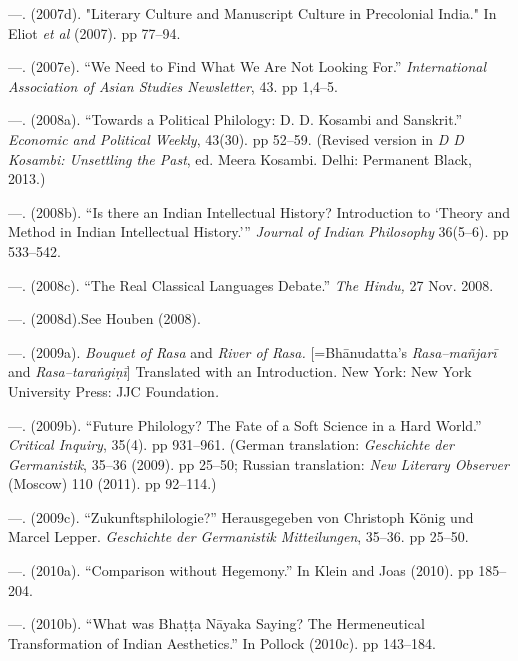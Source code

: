  \item —. (2007d). "Literary Culture and Manuscript Culture in Precolonial India." In Eliot \textit{et al} (2007). pp 77–94.

 \item —. (2007e). “We Need to Find What We Are Not Looking For.” \textit{International Association of Asian Studies Newsletter}, 43. pp 1,4–5.

 \item —. (2008a). “Towards a Political Philology: D. D. Kosambi and Sanskrit.” \textit{Economic and Political Weekly}, 43(30). pp 52–59. (Revised version in \textit{D D Kosambi: Unsettling the Past}, ed. Meera Kosambi. Delhi: Permanent Black, 2013.)

 \item —. (2008b). “Is there an Indian Intellectual History? Introduction to ‘Theory and Method in Indian Intellectual History.’” \textit{Journal of Indian Philosophy} 36(5–6). pp 533–542.

 \item —. (2008c). “The Real Classical Languages Debate.” \textit{The Hindu,} 27 Nov. 2008.

 \item —. (2008d).See Houben (2008).

 \item —. (2009a).\textit{ Bouquet of Rasa }and\textit{ River of Rasa. }[=Bhānudatta’s \textit{Rasa–mañjarī} and \textit{Rasa–taraṅgiṇī}] Translated with an Introduction. New York: New York University Press: JJC Foundation\textit{.}

 \item —. (2009b). “Future Philology? The Fate of a Soft Science in a Hard World.” \textit{Critical Inquiry}, 35(4). pp 931–961. (German translation: \textit{Geschichte der Germanistik}, 35–36 (2009). pp 25–50; Russian translation: \textit{New Literary Observer }(Moscow) 110 (2011). pp 92–114.) 

 \item —. (2009c). “Zukunftsphilologie?” Herausgegeben von Christoph König und Marcel Lepper. \textit{Geschichte der Germanistik Mitteilungen}, 35–36. pp 25–50.

 \item —. (2010a). “Comparison without Hegemony.” In Klein and Joas (2010). pp 185–204.

 \item —. (2010b). “What was Bhaṭṭa Nāyaka Saying? The Hermeneutical Transformation of Indian Aesthetics.” In Pollock (2010c). pp 143–184.

